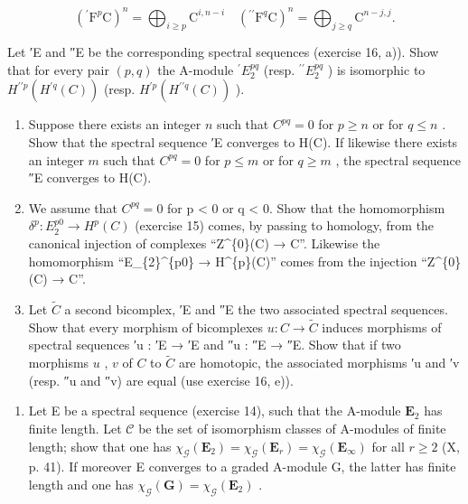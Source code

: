 \[
\left(^ {\prime} \mathrm{F} ^ {p} \mathrm{C}\right) ^ {n} = \bigoplus_ {i \geqslant p} \mathrm{C} ^ {i, n - i} \quad \left(^ {\prime \prime} \mathrm{F} ^ {q} \mathrm{C}\right) ^ {n} = \bigoplus_ {j \geqslant q} \mathrm{C} ^ {n - j, j}.
\]

Let ′E and ″E be the corresponding spectral sequences (exercise 16, a)). Show that for every pair \((p, q)\) the A-module \({}^{\prime}E_2^{pq}\) (resp. \({}^{\prime\prime}E_2^{pq}\) ) is isomorphic to \(H^{\prime\prime p}(H^{\prime q}(C))\) (resp. \(H^{\prime p}(H^{\prime\prime q}(C))\) ).

\begin{enumerate}
\def\labelenumi{\alph{enumi})}
\setcounter{enumi}{1}
\item
  Suppose there exists an integer \(n\) such that \(C^{pq} = 0\) for \(p \geqslant n\) or for \(q \leqslant n\) . Show that the spectral sequence ′E converges to H(C). If likewise there exists an integer \(m\) such that \(C^{pq} = 0\) for \(p \leqslant m\) or for \(q \geqslant m\) , the spectral sequence ″E converges to H(C).
\item
  We assume that \(C^{pq} = 0\) for p \textless{} 0 or q \textless{} 0. Show that the homomorphism \(\delta^{p}: E_{2}^{p0} \to H^{p}(C)\) (exercise 15) comes, by passing to homology, from the canonical injection of complexes ``Z\^{}\{0\}(C) → C''. Likewise the homomorphism ``E\_\{2\}\^{}\{p0\} → H\^{}\{p\}(C)'' comes from the injection ``Z\^{}\{0\}(C) → C''.
\item
  Let \(\tilde{C}\) a second bicomplex, ′E and ″E the two associated spectral sequences. Show that every morphism of bicomplexes \(u: C \to \tilde{C}\) induces morphisms of spectral sequences ′u : ′E → ′E and ″u : ″E → ″E. Show that if two morphisms \(u\) , \(v\) of \(C\) to \(\tilde{C}\) are homotopic, the associated morphisms ′u and ′v (resp. ″u and ″v) are equal (use exercise 16, e)).
\end{enumerate}

\begin{enumerate}
\def\labelenumi{\arabic{enumi})}
\setcounter{enumi}{17}
\tightlist
\item
  Let E be a spectral sequence (exercise 14), such that the A-module \(\mathbf{E}_2\) has finite length. Let \(\mathcal{C}\) be the set of isomorphism classes of A-modules of finite length; show that one has \(\chi_{\mathcal{G}}(\mathbf{E}_2) = \chi_{\mathcal{G}}(\mathbf{E}_r) = \chi_{\mathcal{G}}(\mathbf{E}_{\infty})\) for all \(r \geqslant 2\) (X, p. 41). If moreover E converges to a graded A-module G, the latter has finite length and one has \(\chi_{\mathcal{G}}(\mathbf{G}) = \chi_{\mathcal{G}}(\mathbf{E}_2)\) .
\end{enumerate}

